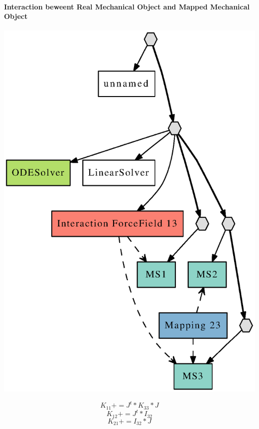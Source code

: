\documentclass[a4paper,10pt]{article}
\begin{document}
\paragraph{Interaction beweent Real Mechanical Object and Mapped Mechanical Object}
\begin{center}
  \includegraphics[scale=0.3]{interaction_Real_Mapped}
\end{center}
\[
K_{11} += J^t * K_{33} * J 
\]
\[
K_{12} += J^t * I_{32}
\]
\[
K_{21} += I_{32} * J 
\]
\end{document}
